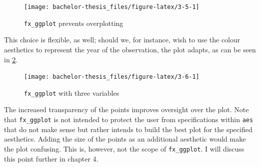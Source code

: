 \documentclass[]{report}
\newenvironment{Shaded}{\begin{snugshade}}{\end{snugshade}}
\newcommand{\KeywordTok}[1]{\textcolor[rgb]{0.13,0.29,0.53}{\textbf{#1}}}
\newcommand{\DataTypeTok}[1]{\textcolor[rgb]{0.13,0.29,0.53}{#1}}
\newcommand{\StringTok}[1]{\textcolor[rgb]{0.31,0.60,0.02}{#1}}
\newcommand{\OperatorTok}[1]{\textcolor[rgb]{0.81,0.36,0.00}{\textbf{#1}}}
\newcommand{\NormalTok}[1]{#1}
\theoremstyle{definition}
\theoremstyle{definition}
\theoremstyle{definition}
\theoremstyle{remark}
\begin{document}
\begin{Shaded}
\end{Shaded}

\begin{figure}

{\centering \texttt{[image: bachelor-thesis\_files/figure-latex/3-5-1]} 

}

\caption{\texttt{fx\_ggplot} prevents overplotting}\label{fig:3-5}
\end{figure}



This choice is flexible, as well; should we, for instance, wish to use
the colour aesthetics to represent the year of the observation, the plot
adapts, as can be seen in \ref{fig:3-6}.

\begin{Shaded}
\end{Shaded}

\begin{figure}

{\centering \texttt{[image: bachelor-thesis\_files/figure-latex/3-6-1]} 

}

\caption{\texttt{fx\_ggplot} with three variables}\label{fig:3-6}
\end{figure}



The increased transparency of the points improves oversight over the
plot. Note that \texttt{fx\_ggplot} is not intended to protect the user
from specifications within \texttt{aes} that do not make sense but
rather intends to build the best plot for the specified aesthetics.
Adding the size of the points as an additional aesthetic would make the
plot confusing. This is, however, not the scope of \texttt{fx\_ggplot}.
I will discuss this point further in chapter 4.
\end{document}
